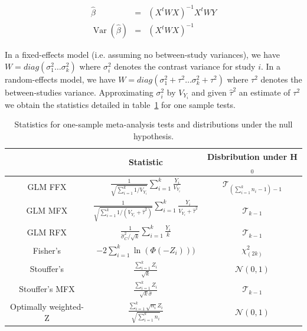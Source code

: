 \documentclass{llncs}
\DeclareMathOperator{\Var}{Var}
\newcommand{\effectvector}{Y}
\newcommand{\effect}[1][i]{\effectvector_{#1}}
\newcommand{\vareffect}[1][i]{V_{\effect[#1]}}
\newcommand{\zeffect}[1][i]{Z_{#1}}
\newcommand{\nStudies}{k}
\newcommand{\varCombined}{\sigma^2_{C}}
\newcommand{\varBetween}{\tau^2}
\newcommand{\varWithin}[1][i]{\sigma^2_{#1}}
\begin{document}

\begin{eqnarray}
	\hat \beta  &=& (X^t W X)^{-1} X^t W \effectvector \\
	\Var(\hat \beta)  &=& (X^t W X)^{-1}
	\label{eq_WLS}
\end{eqnarray}

In a fixed-effects model (i.e. assuming no between-study variances), we have $W = diag( \varWithin[1] \ldots \varWithin[\nStudies] )$ where $\varWithin$ denotes the contrast variance for study $i$. In a random-effects model, we have $W = diag( \varWithin[1] + \varBetween \ldots \varWithin[\nStudies] + \varBetween )$ where $\varBetween$ denotes the between-studies variance. Approximating $\varWithin$ by $\vareffect[i]$ and given $\hat\varBetween$ an estimate of $\varBetween$ we obtain the statistics detailed in table~\ref{stat_table} for one sample tests.

\begin{table}[h]
\begin{center}
\begin{tabular}{ccc}
						& Statistic			& Disbribution under H$_0$ \\
\hline						
GLM FFX 				& $ \displaystyle \frac{1}{ \sqrt{\sum_{i=1}^\nStudies 1/\vareffect }} \sum_{i=1}^\nStudies \frac{\effect}{\vareffect}$ & $\mathcal{T}_{ (\sum_{i=1}^\nStudies n_i - 1) - 1}$ \\
GLM MFX 				& $ \displaystyle \frac{1}{ \sqrt{\sum_{i=1}^\nStudies 1/ (\vareffect + \hat\varBetween) }} \sum_{i=1}^\nStudies \frac{\effect}{\vareffect + \hat\varBetween}$ & $\mathcal{T}_{\nStudies - 1}$ \\
GLM RFX	 				& $ \displaystyle \frac{1}{\widehat\varCombined / \sqrt{\nStudies}} \sum_{i=1}^\nStudies \frac{\effect}{\nStudies}$ & $\mathcal{T}_{\nStudies - 1}$ \\
Fisher's 				& $\displaystyle -2 \sum_{i=1}^{\nStudies} \ln( \Phi(-\zeffect) ) )$ & $\chi^2_{(2\nStudies)}$\\
Stouffer's 				& $\displaystyle  \frac{\sum_{i=1}^\nStudies \zeffect}{\sqrt{\nStudies}}$ & $\mathcal{N}(0,1)$ \\
Stouffer's MFX			& $\displaystyle  \frac{\sum_{i=1}^\nStudies \zeffect}{\sqrt{\nStudies} \hat \sigma}$ & $\mathcal{T}_{\nStudies-1}$ \\
Optimally weighted-Z	& $\displaystyle  \frac{\sum_{i=1}^\nStudies  \sqrt{n_i} \zeffect}{\sqrt{\sum_{i=1}^\nStudies n_i}}$ & $\mathcal{N}(0,1)$ \\
\hline 

\end{tabular}
\end{center}
\caption{Statistics for one-sample meta-analysis tests and distributions under the null hypothesis.}
\label{stat_table}
\end{table}
\end{document}
